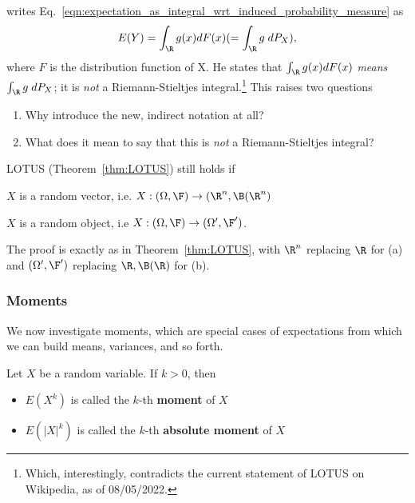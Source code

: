 \documentclass{article} %
\begin{document}
\begin{question}{}	
\cite[pp.188]{ash2000probability} writes Eq.~\eqref{eqn:expectation_as_integral_wrt_induced_probability_measure} as 
\[  E(Y)= \int_\R g(x) dF(x) (= \int_\R g \; dP_X), \]
where $F$ is the distribution function of X.  He states that $\int_\R g(x) dF(x)$ \textit{means} $\int_\R g \; dP_X$; it is \textit{not} a Riemann-Stieltjes integral.\footnote{Which, interestingly, contradicts the current statement of LOTUS on Wikipedia, as of 08/05/2022.} This raises two questions

\begin{enumerate}
	\item Why introduce the new, indirect notation at all?
	\item What does it mean to say that this is \textit{not} a Riemann-Stieltjes integral?  
\end{enumerate} 


\end{question}

\begin{remark}{}
LOTUS (Theorem~\ref{thm:LOTUS}) still holds if 
\begin{alphabate}
\item $X$ is a random vector, i.e. $X : (\Omega, \F) \to (\R^n, \B(\R^n)$
\item $X$ is a random object, i.e $X: (\Omega, \F) \to (\Omega', \F')$.
\end{alphabate}
The proof is exactly as in Theorem~\ref{thm:LOTUS}, with $\R^n$ replacing $\R$ for (a) and $(\Omega', \F')$ replacing $\R, \B(\R)$ for (b).
\label{rk:LOTUS_applies_for_random_vectors_and_random_objects}
\end{remark}

\subsubsection{Moments}

We now investigate moments, which are special cases of expectations from which we can build means, variances, and so forth.

\begin{definition}
Let $X$ be a random variable.  If $k>0$, then 
\begin{itemize}
\item $E(X^k)$  is called the $k$-th  \textbf{moment} of $X$
\item $E(|X|^k)$  is called the $k$-th  \textbf{absolute moment} of $X$	
\end{itemize}
\end{definition}
\end{document}
